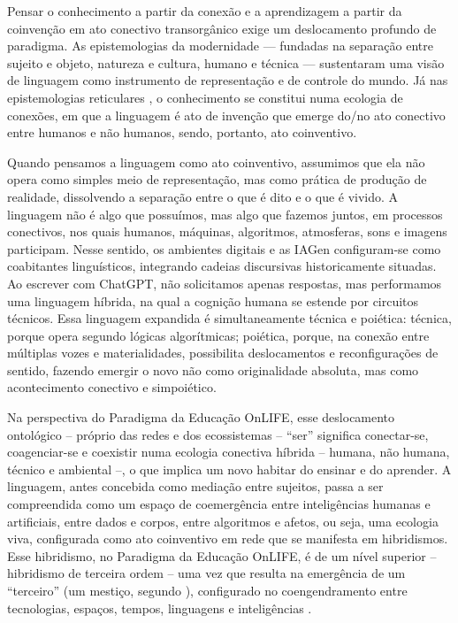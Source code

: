 \documentclass[portuguese]{textolivre}
\begin{document}
Pensar o conhecimento a partir da conexão e a aprendizagem a partir da coinvenção em ato conectivo transorgânico exige um deslocamento profundo de paradigma. As epistemologias da modernidade — fundadas na separação entre sujeito e objeto, natureza e cultura, humano e técnica — sustentaram uma visão de linguagem como instrumento de representação e de controle do mundo. Já nas epistemologias reticulares \cite{difelice2012redessociais}, o conhecimento se constitui numa ecologia de conexões, em que a linguagem é ato de invenção que emerge do/no ato conectivo entre humanos e não humanos, sendo, portanto, ato coinventivo.

Quando pensamos a linguagem como ato coinventivo, assumimos que ela não opera como simples meio de representação, mas como prática de produção de realidade, dissolvendo a separação entre o que é dito e o que é vivido. A linguagem não é algo que possuímos, mas algo que fazemos juntos, em processos conectivos, nos quais humanos, máquinas, algoritmos, atmosferas, sons e imagens participam. Nesse sentido, os ambientes digitais e as IAGen configuram-se como coabitantes linguísticos, integrando cadeias discursivas historicamente situadas. Ao escrever com ChatGPT, não solicitamos apenas respostas, mas performamos uma linguagem híbrida, na qual a cognição humana se estende por circuitos técnicos. Essa linguagem expandida é simultaneamente técnica e poiética: técnica, porque opera segundo lógicas algorítmicas; poiética, porque, na conexão entre múltiplas vozes e materialidades, possibilita deslocamentos e reconfigurações de sentido, fazendo emergir o novo não como originalidade absoluta, mas como acontecimento conectivo e simpoiético.

Na perspectiva do Paradigma da Educação OnLIFE, esse deslocamento ontológico – próprio das redes e dos ecossistemas – “ser” significa conectar-se, coagenciar-se e coexistir numa ecologia conectiva híbrida – humana, não humana, técnico e ambiental –, o que implica um novo habitar do ensinar e do aprender. A linguagem, antes concebida como mediação entre sujeitos, passa a ser compreendida como um espaço de coemergência entre inteligências humanas e artificiais, entre dados e corpos, entre algoritmos e afetos, ou seja, uma ecologia viva, configurada como ato coinventivo em rede que se manifesta em hibridismos. Esse hibridismo, no Paradigma da Educação OnLIFE, é de um nível superior – hibridismo de terceira ordem – uma vez que resulta na emergência de um “terceiro” (um mestiço, segundo \textcite{serres1993filosofiamestica}), configurado no coengendramento entre tecnologias, espaços, tempos, linguagens e inteligências \cite{schlemmer2024inteligencias}.
\end{document}
